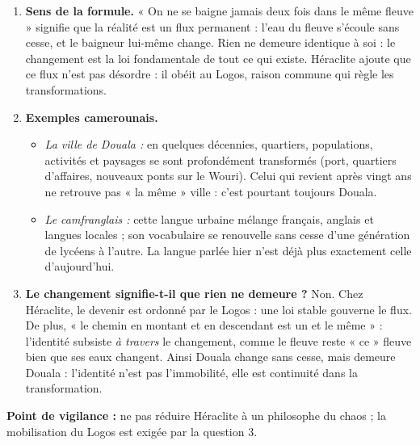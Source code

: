 \documentclass[11pt]{article}
\newcommand{\cle}[1]{{\popxbold\color{popdark}#1}}
\begin{document}
\begin{corrige}
\begin{enumerate}
\item \textbf{Sens de la formule.} « On ne se baigne jamais deux fois dans le même fleuve » signifie que la réalité est un flux permanent : l'eau du fleuve s'écoule sans cesse, et le baigneur lui-même change. Rien ne demeure identique à soi : le changement est la loi fondamentale de tout ce qui existe. Héraclite ajoute que ce flux n'est pas désordre : il obéit au \cle{Logos}, raison commune qui règle les transformations.
\item \textbf{Exemples camerounais.}
\begin{itemize}
\item \emph{La ville de Douala :} en quelques décennies, quartiers, populations, activités et paysages se sont profondément transformés (port, quartiers d'affaires, nouveaux ponts sur le Wouri). Celui qui revient après vingt ans ne retrouve pas « la même » ville : c'est pourtant toujours Douala.
\item \emph{Le camfranglais :} cette langue urbaine mélange français, anglais et langues locales ; son vocabulaire se renouvelle sans cesse d'une génération de lycéens à l'autre. La langue parlée hier n'est déjà plus exactement celle d'aujourd'hui.
\end{itemize}
\item \textbf{Le changement signifie-t-il que rien ne demeure ?} Non. Chez Héraclite, le devenir est ordonné par le \cle{Logos} : une loi stable gouverne le flux. De plus, « le chemin en montant et en descendant est un et le même » : l'identité subsiste \emph{à travers} le changement, comme le fleuve reste « ce » fleuve bien que ses eaux changent. Ainsi Douala change sans cesse, mais demeure Douala : l'identité n'est pas l'immobilité, elle est continuité dans la transformation.
\end{enumerate}
\textbf{Point de vigilance :} ne pas réduire Héraclite à un philosophe du chaos ; la mobilisation du \cle{Logos} est exigée par la question 3.
\end{corrige}
\end{document}
